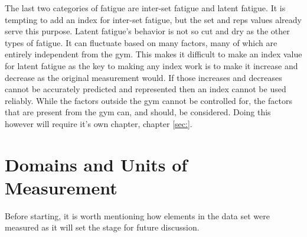 The last two categories of fatigue are inter-set fatigue and latent fatigue. It is tempting to add an index for inter-set fatigue, but the set and reps values already serve this purpose. Latent fatigue's behavior is not so cut and dry as the other types of fatigue. It can fluctuate based on many factors, many of which are entirely independent from the gym. This makes it difficult to make an index value for latent fatigue as the key to making any index work is to make it increase and decrease as the original measurement would. If those increases and decreases cannot be accurately predicted and represented then an index cannot be used reliably. While the factors outside the gym cannot be controlled for, the factors that are present from the gym can, and should, be considered. Doing this however will require it's own chapter, chapter \ref{sec:}.


\section{Domains and Units of Measurement}
\label{sec:UnitsOfMeasurement}

Before starting, it is worth mentioning how elements in the data set were measured as it will set the stage for future discussion.

